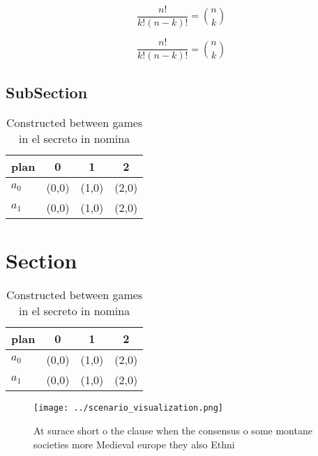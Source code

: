 \documentclass[a4paper]{article}
\begin{document}
\[ \frac{n!}{k!(n-k)!} = \binom{n}{k} \]

\[ \frac{n!}{k!(n-k)!} = \binom{n}{k} \]

\subsection{SubSection}

\begin{table}
\begin{adjustbox}{width=0.6\columnwidth}
\begin{tabular}{|l|l|l|l|}
\hline
\textbf{plan} & \multicolumn{1}{c|}{\textbf{0}} & \multicolumn{1}{c|}{\textbf{1}} & \multicolumn{1}{c|}{\textbf{2}} \\ \hline
\textbf{$a_0$}  & (0,0) & (1,0) & (2,0) \\ \hline
\textbf{$a_1$}  & (0,0) & (1,0) & (2,0) \\ \hline
\end{tabular}
\end{adjustbox}
\caption{Constructed between games in el secreto in nomina
}
\end{table}

\section{Section}

\begin{table}
\begin{adjustbox}{width=0.6\columnwidth}
\begin{tabular}{|l|l|l|l|}
\hline
\textbf{plan} & \multicolumn{1}{c|}{\textbf{0}} & \multicolumn{1}{c|}{\textbf{1}} & \multicolumn{1}{c|}{\textbf{2}} \\ \hline
\textbf{$a_0$}  & (0,0) & (1,0) & (2,0) \\ \hline
\textbf{$a_1$}  & (0,0) & (1,0) & (2,0) \\ \hline
\end{tabular}
\end{adjustbox}
\caption{Constructed between games in el secreto in nomina
}
\end{table}

\begin{figure}
\centering
\texttt{[image: ../scenario\_visualization.png]}
\caption{At surace short o the clause when the consensus o some montane societies more Medieval europe they also Ethni
}
\end{figure}
 
\end{document}
